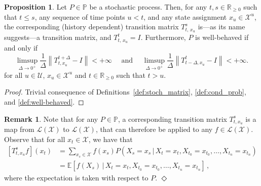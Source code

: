 \documentclass[10pt]{paper}
\theoremstyle{definition}
\newtheorem{proposition}[theorem]{Proposition}
\newtheorem*{remark*}{Remark}
\newcommand{\reals}{\mathbb{R}}
\newcommand{\realsnonneg}{\reals_{\geq 0}}
\newcommand{\states}{\mathcal{X}}
\newcommand{\processes}{\mathbb{P}}
\newcommand{\gambles}{\mathcal{L}}
\newcommand{\gamblesX}{\gambles(\states)}
\newcommand{\norm}[1]{\left\lVert #1 \right\rVert}
\newcommand{\exampleend}{\hfill$\Diamond$}
\begin{document}
\begin{proposition}\label{prop:stochasticprocess:simpleproperties}
Let $P\in\processes$ be a stochastic process.  %
Then, for any $t,s\in\realsnonneg$ such that $t\leq s$, any sequence of time points $u<t$, and any state assignment $x_u\in\states^u$, the corresponding (history dependent) transition matrix $T_{t,\,x_u}^s$ is---as its name suggests---a transition matrix, and $T_{t,\,x_u}^t=I$. Furthermore, $P$ is well-behaved if and only if
\begin{equation}\label{eq:wellbehavedtransitionmatrix}%
\limsup_{\Delta\to 0^{+}}\frac{1}{\Delta}\norm{T_{t,x_u}^{t+\Delta}-I}<+\infty
\text{~~~~and~~~~}
\limsup_{\Delta\to 0^{+}}\frac{1}{\Delta}\norm{T_{t-\Delta,x_u}^t-I}<+\infty.
\end{equation}
for all $u\in\mathcal{U}$, $x_u\in\states^u$ and $t\in\reals_{\geq0}$ such that $t>u$.
\end{proposition}
\begin{proof}
Trivial consequence of Definitions~\ref{def:stoch_matrix}, \ref{def:cond_prob}, and \ref{def:well-behaved}.
\end{proof}

\begin{remark*}
Note that for any $P\in\processes$, a corresponding transition matrix $T_{t, x_u}^s$ is a map from $\gamblesX$ to $\gamblesX$, that can therefore be applied to any $f\in\gamblesX$. Observe that for all $x_t\in\states$, we have that
\begin{align*}
\left[T_{t,x_u}^sf\right](x_t) &= \sum_{x_s\in\states}f(x_s)P(X_s=x_s\,\vert\,X_t=x_t,X_{t_0}=x_{t_0},\ldots,X_{t_n}=x_{t_n})\\
 &= \mathbb{E}\left[f(X_s)\,\vert\,X_t=x_t, X_{t_0}=x_{t_0},\ldots,X_{t_n}=x_{t_n}\right]\,,
\end{align*}
where the expectation is taken with respect to $P$. %
\exampleend
\end{remark*}
\end{document}
